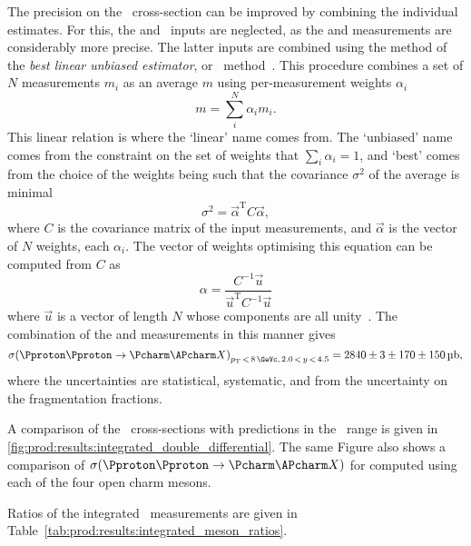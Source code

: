 The precision on the \ccbar\ cross-section can be improved by combining the 
individual estimates.
For this, the \PDsplus and \PDstarp\ inputs are neglected, as the \PDzero and 
\PDplus measurements are considerably more precise.
The latter inputs are combined using the method of the \emph{best linear 
  unbiased estimator}, or \blue\ method~\cite{Lyons:1988rp}.
This procedure combines a set of $N$ measurements $m_{i}$ as an average $m$ 
using per-measurement weights $\alpha_{i}$
\begin{equation}
  m = \sum_{i}^{N} \alpha_{i}m_{i}.
  \label{eqn:results:blue}
\end{equation}
This linear relation is where the `linear' name comes from.
The `unbiased' name comes from the constraint on the set of weights that 
$\sum_{i}\alpha_{i} = 1$, and `best' comes from the choice of the weights being 
such that the covariance $\sigma^{2}$ of the average is minimal
\begin{equation}
  \sigma^{2} = \vec{\alpha}^{\text{T}}C\vec{\alpha},
  \label{eqn:results:blue_variance}
\end{equation}
where $C$ is the covariance matrix of the input measurements, and 
$\vec{\alpha}$ is the vector of $N$ weights, each $\alpha_{i}$.
The vector of weights optimising this equation can be computed from $C$ as
\begin{equation}
  \alpha = \frac{C^{-1}\vec{u}}{\vec{u}^{\text{T}}C^{-1}\vec{u}}
  \label{eqn:results:blue_weights}
\end{equation}
where $\vec{u}$ is a vector of length $N$ whose components are all 
unity~\cite{Lyons:1988rp}.
The combination of the \PDzero and \PDplus measurements in this manner gives
\begin{equation*}
  \xsec{(\ppToccbarX)}_{\pT\,<\,8\,\si{\GeVc},\,2.0\,<\,y\,<\,4.5} =
    \SI[parse-numbers=false]{2840 \pm 3 \pm 170 \pm 150}{\micro\barn},
\end{equation*}
where the uncertainties are statistical, systematic, and from the uncertainty 
on the fragmentation fractions.

A comparison of the \ccbar\ cross-sections with predictions in the \pT\ range 
 is given in 
\cref{fig:prod:results:integrated_double_differential}.
The same Figure also shows a comparison of $\xsec(\ppToccbarX)$ for 
 computed using each of the four open charm mesons.

Ratios of the integrated \xsectimesbfrac\ measurements are given in 
Table~\ref{tab:prod:results:integrated_meson_ratios}.

